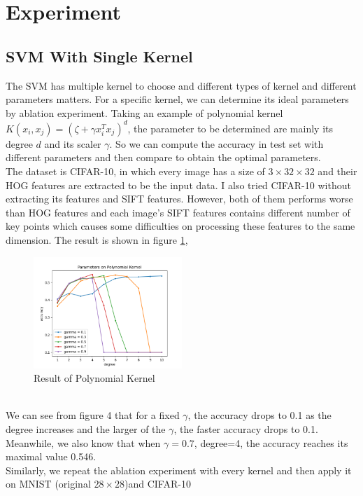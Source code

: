 \documentclass[twocolumn, a4paper]{article}
\begin{document}
\section{Experiment}

\subsection{SVM With Single Kernel}
The SVM has multiple kernel to choose and different types of kernel and different parameters matters. For a specific kernel, we can determine its ideal parameters by ablation experiment. Taking an example of polynomial kernel $K(x_i, x_j) = (\zeta + \gamma x_i^Tx_j)^d$, the parameter to be determined are mainly its degree $d$ and its scaler $\gamma$. So we can compute the accuracy in test set with different parameters and then compare to obtain the optimal parameters.\\
The dataset is CIFAR-10, in which every image has a size of  $3\times 32\times 32$ and their HOG features are extracted to be the input data. I also tried CIFAR-10 without extracting its features and SIFT features. However, both of them performs worse than HOG features and each image's SIFT features contains different number of key points which causes some difficulties on processing these features to the same dimension. The result is shown in figure \ref{fig:poly},
\begin{figure}[htb]
  \centering
  \includegraphics[width=0.5\textwidth]{Figure_1.png}
  \caption{Result of Polynomial Kernel}
  \label{fig:poly}
\end{figure}\\
We can see from figure 4 that for a fixed $\gamma$, the accuracy drops to 0.1 as the degree increases and the larger of the $\gamma$, the faster accuracy drops to 0.1. Meanwhile, we also know that when $\gamma=0.7$, degree=4, the accuracy reaches its maximal value 0.546.
\\Similarly, we repeat the ablation experiment with every kernel and then apply it on MNIST (original $28\times 28$)and CIFAR-10
\end{document}
